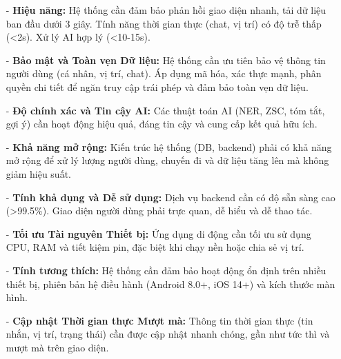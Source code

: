 \begin{itemize}
    \item[-] \textbf{Hiệu năng:} Hệ thống cần đảm bảo phản hồi giao diện nhanh, tải dữ liệu ban đầu dưới 3 giây. Tính năng thời gian thực (chat, vị trí) có độ trễ thấp (<2s). Xử lý AI hợp lý (<10-15s).

    \item[-] \textbf{Bảo mật và Toàn vẹn Dữ liệu:} Hệ thống cần ưu tiên bảo vệ thông tin người dùng (cá nhân, vị trí, chat). Áp dụng mã hóa, xác thực mạnh, phân quyền chi tiết để ngăn truy cập trái phép và đảm bảo toàn vẹn dữ liệu.

    \item[-] \textbf{Độ chính xác và Tin cậy AI:} Các thuật toán AI (NER, ZSC, tóm tắt, gợi ý) cần hoạt động hiệu quả, đáng tin cậy và cung cấp kết quả hữu ích.

    \item[-] \textbf{Khả năng mở rộng:} Kiến trúc hệ thống (DB, backend) phải có khả năng mở rộng để xử lý lượng người dùng, chuyến đi và dữ liệu tăng lên mà không giảm hiệu suất.

    \item[-] \textbf{Tính khả dụng và Dễ sử dụng:} Dịch vụ backend cần có độ sẵn sàng cao (>99.5\%). Giao diện người dùng phải trực quan, dễ hiểu và dễ thao tác.

    \item[-] \textbf{Tối ưu Tài nguyên Thiết bị:} Ứng dụng di động cần tối ưu sử dụng CPU, RAM và tiết kiệm pin, đặc biệt khi chạy nền hoặc chia sẻ vị trí.

    \item[-] \textbf{Tính tương thích:} Hệ thống cần đảm bảo hoạt động ổn định trên nhiều thiết bị, phiên bản hệ điều hành (Android 8.0+, iOS 14+) và kích thước màn hình.

    \item[-] \textbf{Cập nhật Thời gian thực Mượt mà:} Thông tin thời gian thực (tin nhắn, vị trí, trạng thái) cần được cập nhật nhanh chóng, gần như tức thì và mượt mà trên giao diện.
\end{itemize}